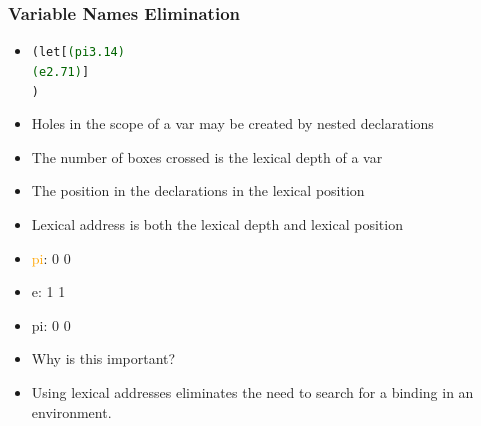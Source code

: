 \documentclass{beamer}
\begin{document}
\begin{frame}[fragile]
\frametitle{Variable Names Elimination}
\begin{scriptsize}
\begin{itemize}
\item<1->
\begin{alltt}
(let [\textcolor{darkgreen}{(pi 3.14)}
	      \textcolor{darkgreen}{(e 2.71)}]
)
\end{alltt}

\item<1-> Holes in the scope of a var may be created by  nested declarations

\item<1-> The number of boxes crossed is the lexical depth of a var

\item<1-> The position in the declarations in the lexical position

\item<1-> Lexical address is both the lexical depth and lexical position

\item<2-> \textcolor{orange}{pi}: 0 0

\item<2-> e: 1 1

\item<2-> pi: 0 0

\item<3-> Why is this important?

\item<4-> Using lexical addresses eliminates the need to search for a binding in an environment.

\end{itemize}
\end{scriptsize}
\end{frame}
\end{document}
